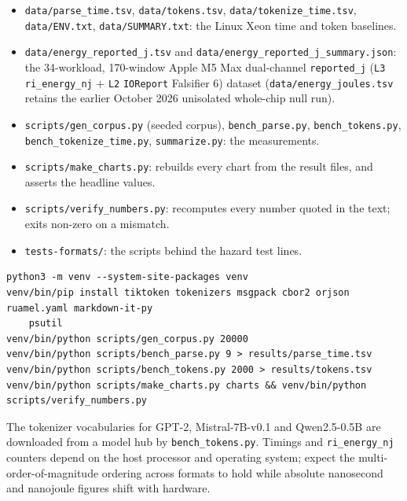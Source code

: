 \documentclass[10pt,letterpaper]{article}
\providecommand{\tightlist}{\setlength{\itemsep}{1pt}\setlength{\parskip}{0pt}}
\begin{document}
\begin{itemize}
\tightlist
\item
  \texttt{data/\allowbreak{}parse\_\allowbreak{}time.\allowbreak{}tsv}, \texttt{data/tokens.tsv},
  \texttt{data/\allowbreak{}tokenize\_\allowbreak{}time.\allowbreak{}tsv}, \texttt{data/ENV.txt},
  \texttt{data/\allowbreak{}SUMMARY.\allowbreak{}txt}: the Linux Xeon time and token baselines.
\item
  \texttt{data/\allowbreak{}energy\_\allowbreak{}reported\_\allowbreak{}j.\allowbreak{}tsv} and
  \texttt{data/\allowbreak{}energy\_\allowbreak{}reported\_\allowbreak{}j\_\allowbreak{}summary.\allowbreak{}json}: the 34-workload,
  170-window Apple M5 Max dual-channel \texttt{reported\_j} (\texttt{L3}
  \texttt{ri\_energy\_nj} + \texttt{L2} \texttt{IOReport} Falsifier 6)
  dataset (\texttt{data/\allowbreak{}energy\_\allowbreak{}joules.\allowbreak{}tsv} retains the earlier October
  2026 unisolated whole-chip null run).
\item
  \texttt{scripts/\allowbreak{}gen\_\allowbreak{}corpus.\allowbreak{}py} (seeded corpus),
  \texttt{bench\_parse.py}, \texttt{bench\_\allowbreak{}tokens.\allowbreak{}py},
  \texttt{bench\_\allowbreak{}tokenize\_\allowbreak{}time.\allowbreak{}py}, \texttt{summarize.py}: the
  measurements.
\item
  \texttt{scripts/\allowbreak{}make\_\allowbreak{}charts.\allowbreak{}py}: rebuilds every chart from the result
  files, and asserts the headline values.
\item
  \texttt{scripts/\allowbreak{}verify\_\allowbreak{}numbers.\allowbreak{}py}: recomputes every number quoted in
  the text; exits non-zero on a mismatch.
\item
  \texttt{tests-formats/}: the scripts behind the hazard test lines.
\end{itemize}

\begin{verbatim}
python3 -m venv --system-site-packages venv
venv/bin/pip install tiktoken tokenizers msgpack cbor2 orjson ruamel.yaml markdown-it-py
    psutil
venv/bin/python scripts/gen_corpus.py 20000
venv/bin/python scripts/bench_parse.py 9 > results/parse_time.tsv
venv/bin/python scripts/bench_tokens.py 2000 > results/tokens.tsv
venv/bin/python scripts/make_charts.py charts && venv/bin/python scripts/verify_numbers.py
\end{verbatim}

The tokenizer vocabularies for GPT-2, Mistral-7B-v0.1 and Qwen2.5-0.5B
are downloaded from a model hub by \texttt{bench\_\allowbreak{}tokens.\allowbreak{}py}. Timings
and \texttt{ri\_energy\_nj} counters depend on the host processor and
operating system; expect the multi-order-of-magnitude ordering across
formats to hold while absolute nanosecond and nanojoule figures shift
with hardware.
\end{document}
